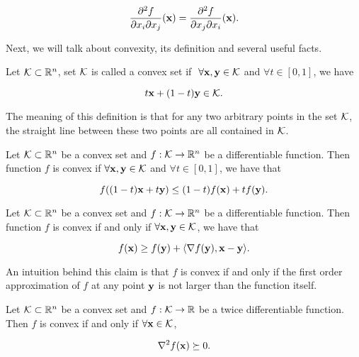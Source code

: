\documentclass[../main.tex]{subfiles}
\begin{document}
\begin{equation*}
	\frac{\partial ^2 f}{\partial x_i \partial x_j} (\mathbf{x}) = \frac{\partial ^2 f}{\partial x_j \partial x_i} (\mathbf{x}).
\end{equation*}

Next, we will talk about convexity, its definition and several useful facts.

\begin{definition}
	Let $\mathcal{K} \subset \mathbb{R}^n$, set $\mathcal{K}$ is called a convex set if  $\ \forall \mathbf{x},\mathbf{y} \in \mathcal{K}$ and $\forall t \in [0,1]$, we have
	
	\begin{equation}
		t\mathbf{x} + (1-t)\mathbf{y} \in \mathcal{K}.
	\end{equation}
	
	The meaning of this definition is that for any two arbitrary points in the set $\mathcal{K}$, the straight line between these two points are all contained in $\mathcal{K}$.
\end{definition}

\begin{definition}
	Let $\mathcal{K} \subset \mathbb{R}^n$ be a convex set and $f: \mathcal{K} \to \mathbb{R}^n$ be a differentiable function. Then function $f$ is convex if $\forall \mathbf{x},\mathbf{y} \in \mathcal{K}$ and $\forall t\in [0, 1]$, we have that
	
	\begin{equation}
	f((1-t)\mathbf{x} + t \mathbf{y}) \leq (1-t) f(\mathbf{x})+ t f(\mathbf{y}). \label{convex_f_1}
	\end{equation}
\end{definition}


\begin{claim}
	Let $\mathcal{K} \subset \mathbb{R}^n$ be a convex set and $f: \mathcal{K} \to \mathbb{R}^n$ be a differentiable function. Then function $f$ is convex if and only if $\forall \mathbf{x},\mathbf{y} \in \mathcal{K}$, we have that
	
	\begin{equation}
		f(\mathbf{x}) \geq f(\mathbf{y}) + \langle \nabla f(\mathbf{y}) , \mathbf{x} - \mathbf{y} \rangle. \label{convex_f_2}
	\end{equation}
\end{claim}

An intuition behind this claim is that $f$ is convex if and only if the first order approximation of $f$ at any point $\mathbf{y}$ is not larger than the function itself.
\begin{claim}
	Let $\mathcal{K} \subset \mathbb{R}^n$ be a convex set and $f: \mathcal{K} \to \mathbb{R}$ be a twice differentiable function. Then $f$ is convex if and only if  $\forall \mathbf{x} \in \mathcal{K}$, 
	
	\begin{equation}
		\nabla^2 f(\mathbf{x}) \succeq 0. \label{convex_f_3}
	\end{equation}
\end{claim}
\end{document}
